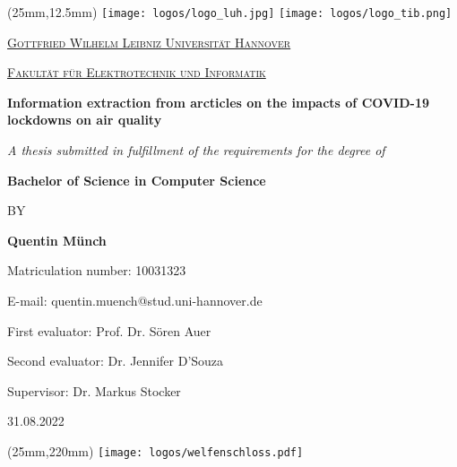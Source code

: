 
\begin{titlepage}
    \centering
    \begin{textblock*}{165mm}(25mm,12.5mm)
        \texttt{[image: logos/logo\_luh.jpg]} \hfill \texttt{[image: logos/logo\_tib.png]}
    \end{textblock*}
    
    \vspace*{1.5em}
    
    {\scshape\Large \href{www.uni-hannover.de}{Gottfried Wilhelm Leibniz Universität Hannover}\par}
    {\scshape\large \href{www.et-inf.uni-hannover.de}{Fakultät für Elektrotechnik und Informatik}\par}
    
    \vfill
    
    {\LARGE\bfseries Information extraction from arcticles on the impacts of COVID-19 lockdowns on air quality \par}
    
    \vfill
    
    {\textit{A thesis submitted in fulfillment of the requirements for the degree of}\par}
    {\textbf{Bachelor of Science in Computer Science}\par}
    
    \vspace*{2em}
    {BY\par}
    \vspace*{2em}
    
    {\bfseries\large Quentin Münch\par}
    {Matriculation number: 10031323\par}
    {E-mail: quentin.muench@stud.uni-hannover.de\par}
    
    \vspace*{2.5em}
    
    {First evaluator: Prof. Dr. Sören Auer\par}
    {Second evaluator: Dr. Jennifer D'Souza\par}
    {Supervisor: Dr. Markus Stocker}
    
    \vfill
    
    {\Large 31.08.2022}
    
    \vspace*{2.5cm}
    
    \begin{textblock*}{165mm}(25mm,220mm)
        \texttt{[image: logos/welfenschloss.pdf]}
    \end{textblock*}
\end{titlepage}

\clearpage
\restoregeometry